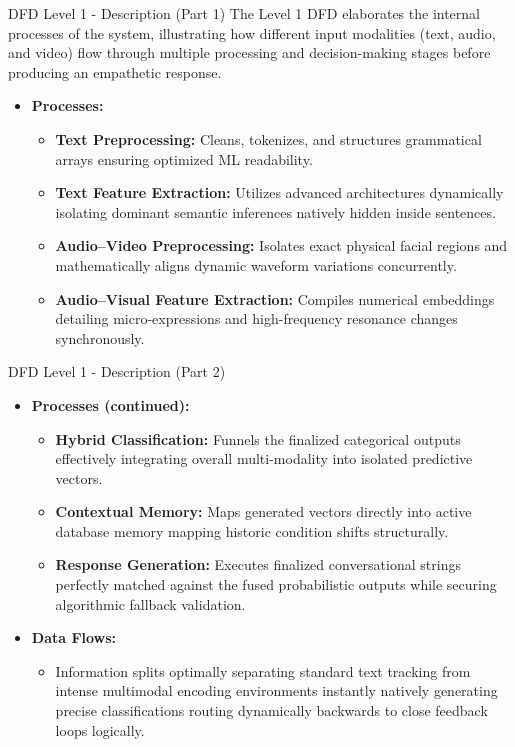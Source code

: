 \documentclass{beamer}
\begin{document}
\begin{frame}{DFD Level 1 - Description (Part 1)}
The Level 1 DFD elaborates the internal processes of the system, illustrating how different input modalities (text, audio, and video) flow through multiple processing and decision-making stages before producing an empathetic response.

\begin{itemize}
    \item \textbf{Processes:}
    \begin{itemize}
        \item \textbf{Text Preprocessing:} Cleans, tokenizes, and structures grammatical arrays ensuring optimized ML readability.
        \item \textbf{Text Feature Extraction:} Utilizes advanced architectures dynamically isolating dominant semantic inferences natively hidden inside sentences.
        \item \textbf{Audio–Video Preprocessing:} Isolates exact physical facial regions and mathematically aligns dynamic waveform variations concurrently.
        \item \textbf{Audio–Visual Feature Extraction:} Compiles numerical embeddings detailing micro-expressions and high-frequency resonance changes synchronously.
    \end{itemize}
\end{itemize}
\end{frame}

\begin{frame}{DFD Level 1 - Description (Part 2)}
\begin{itemize}
    \item \textbf{Processes (continued):}
    \begin{itemize}
        \item \textbf{Hybrid Classification:} Funnels the finalized categorical outputs effectively integrating overall multi-modality into isolated predictive vectors.
        \item \textbf{Contextual Memory:} Maps generated vectors directly into active database memory mapping historic condition shifts structurally.
        \item \textbf{Response Generation:} Executes finalized conversational strings perfectly matched against the fused probabilistic outputs while securing algorithmic fallback validation.
    \end{itemize}
    
    \vspace{0.3cm}
    \item \textbf{Data Flows:}
    \begin{itemize}
        \item Information splits optimally separating standard text tracking from intense multimodal encoding environments instantly natively generating precise classifications routing dynamically backwards to close feedback loops logically.
    \end{itemize}
\end{itemize}
\end{frame}
\end{document}

